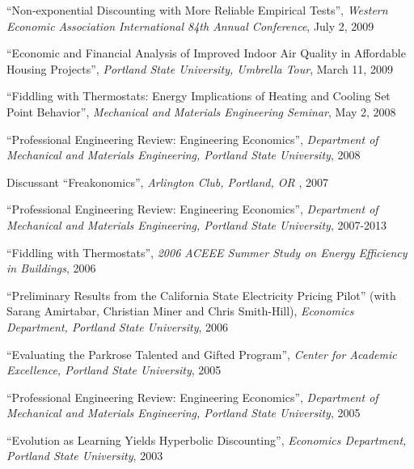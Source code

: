 \documentclass[Computer Science]{vita}
\begin{document}
\begin{vita}
\begin{Presentations and Invited Talks}
  \item ``Non-exponential Discounting with More Reliable Empirical
    Tests'', \emph{Western Economic Association International 84th
      Annual Conference}, July 2, 2009

  \item ``Economic and Financial Analysis of Improved Indoor Air
    Quality in Affordable Housing Projects'', \emph{Portland State
      University, Umbrella Tour}, March 11, 2009

  \item ``Fiddling with Thermostats: Energy Implications of Heating
    and Cooling Set Point Behavior'', \emph{Mechanical and Materials
      Engineering Seminar}, May 2, 2008

  \item ``Professional Engineering Review: Engineering Economics'',
    \emph{Department of Mechanical and Materials Engineering, Portland
      State University}, 2008
  
  \item Discussant ``Freakonomics'', \emph{Arlington Club, Portland,
      OR }, 2007

  \item ``Professional Engineering Review: Engineering Economics'',
    \emph{Department of Mechanical and Materials Engineering, Portland
      State University}, 2007-2013

  \item ``Fiddling with Thermostats'', \emph{2006 ACEEE Summer Study
      on Energy Efficiency in Buildings}, 2006

  \item ``Preliminary Results from the California State Electricity
    Pricing Pilot'' (with Sarang Amirtabar, Christian Miner and Chris
    Smith-Hill), \emph{Economics Department, Portland State
      University}, 2006

  \item ``Evaluating the Parkrose Talented and Gifted Program'',
    \emph{Center for Academic Excellence, Portland State University},
    2005

  \item ``Professional Engineering Review: Engineering Economics'',
    \emph{Department of Mechanical and Materials Engineering, Portland
      State University}, 2005
	
  \item ``Evolution as Learning Yields Hyperbolic Discounting'',
    \emph{Economics Department, Portland State University}, 2003


\end{Presentations and Invited Talks}
\end{vita}
\end{document}
